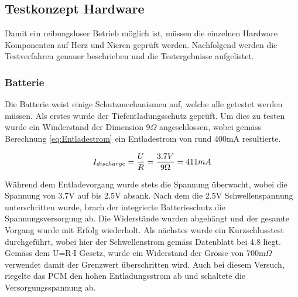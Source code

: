 \subsection{Testkonzept Hardware}\label{sec:testkonzeptHardware}
Damit ein reibungsloser Betrieb möglich ist, müssen die einzelnen Hardware Komponenten auf Herz und Nieren geprüft werden. Nachfolgend werden die Testverfahren genauer beschrieben und die Testergebnisse aufgelistet.

\subsubsection{Batterie}\label{sec:batterie}
Die Batterie weist einige Schutzmechanismen auf, welche alle getestet werden müssen. Als erstes wurde der Tiefentladungsschutz geprüft. Um dies zu testen wurde ein Winderstand der Dimension 9$\Omega$ angeschlossen, wobei gemäss Berechnung \ref{eq:Entladestrom} ein Entladestrom von rund 400mA resultierte.

\begin{equation}
\centering
I_{discharge}=\frac{U}{R}=\frac{3.7V}{9\Omega }= 411mA
\label{eq:Entladestrom}
\end{equation}

Während dem Entladevorgang wurde stets die Spannung überwacht, wobei die Spannung von 3.7V auf bis 2.5V absank. Nach dem die 2.5V Schwellenspannung unterschritten wurde, brach der integrierte Batterieschutz die Spannungsversorgung ab. Die Widerstände wurden abgehängt und der gesamte Vorgang wurde mit Erfolg wiederholt.
\newline
Als nächstes wurde ein Kurzschlusstest durchgeführt, wobei hier der Schwellenstrom gemäss Datenblatt bei 4.8 liegt. Gemäss dem U=R$\cdot$I Gesetz, wurde ein Widerstand der Grösse von 700m$\Omega$ verwendet damit der Grenzwert überschritten wird. Auch bei diesem Versuch, riegelte das PCM den hohen Entladungsstrom ab und schaltete die Versorgungsspannung ab.

